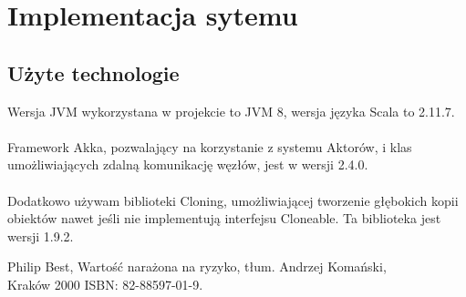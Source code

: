 \documentclass[11pt,titlepage]{article}
\begin{document}
\section{Implementacja sytemu}

\subsection{Użyte technologie}

Wersja JVM wykorzystana w projekcie to JVM 8, wersja języka Scala to 2.11.7. \\
\\
Framework Akka, pozwalający na korzystanie z systemu Aktorów, i klas umożliwiających zdalną komunikację węzłów, jest w wersji 2.4.0.\\
\\
Dodatkowo używam biblioteki Cloning, umożliwiającej tworzenie głębokich kopii obiektów nawet jeśli nie implementują interfejsu Cloneable. Ta biblioteka jest wersji 1.9.2.





\newpage



Philip Best, Wartość narażona na ryzyko, tłum. Andrzej Komański,
\\
Kraków 2000 ISBN: 82-88597-01-9.
\end{document}
